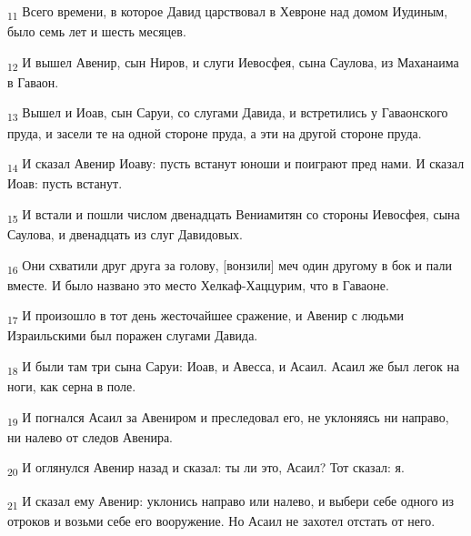 \begin{tcolorbox}
\textsubscript{11} Всего времени, в которое Давид царствовал в Хевроне над домом Иудиным, было семь лет и шесть месяцев.
\end{tcolorbox}
\begin{tcolorbox}
\textsubscript{12} И вышел Авенир, сын Ниров, и слуги Иевосфея, сына Саулова, из Маханаима в Гаваон.
\end{tcolorbox}
\begin{tcolorbox}
\textsubscript{13} Вышел и Иоав, сын Саруи, со слугами Давида, и встретились у Гаваонского пруда, и засели те на одной стороне пруда, а эти на другой стороне пруда.
\end{tcolorbox}
\begin{tcolorbox}
\textsubscript{14} И сказал Авенир Иоаву: пусть встанут юноши и поиграют пред нами. И сказал Иоав: пусть встанут.
\end{tcolorbox}
\begin{tcolorbox}
\textsubscript{15} И встали и пошли числом двенадцать Вениамитян со стороны Иевосфея, сына Саулова, и двенадцать из слуг Давидовых.
\end{tcolorbox}
\begin{tcolorbox}
\textsubscript{16} Они схватили друг друга за голову, [вонзили] меч один другому в бок и пали вместе. И было названо это место Хелкаф-Хаццурим, что в Гаваоне.
\end{tcolorbox}
\begin{tcolorbox}
\textsubscript{17} И произошло в тот день жесточайшее сражение, и Авенир с людьми Израильскими был поражен слугами Давида.
\end{tcolorbox}
\begin{tcolorbox}
\textsubscript{18} И были там три сына Саруи: Иоав, и Авесса, и Асаил. Асаил же был легок на ноги, как серна в поле.
\end{tcolorbox}
\begin{tcolorbox}
\textsubscript{19} И погнался Асаил за Авениром и преследовал его, не уклоняясь ни направо, ни налево от следов Авенира.
\end{tcolorbox}
\begin{tcolorbox}
\textsubscript{20} И оглянулся Авенир назад и сказал: ты ли это, Асаил? Тот сказал: я.
\end{tcolorbox}
\begin{tcolorbox}
\textsubscript{21} И сказал ему Авенир: уклонись направо или налево, и выбери себе одного из отроков и возьми себе его вооружение. Но Асаил не захотел отстать от него.
\end{tcolorbox}
